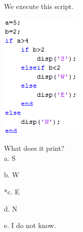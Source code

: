 
We execute this script.

\includegraphics[width=1.57314in,height=2.40659in]{../../Images/ProgrammingStructuresQ1.png}

What does it print? \\

a. S

b. W

*c. E

d. N

e. I do not know. \\
